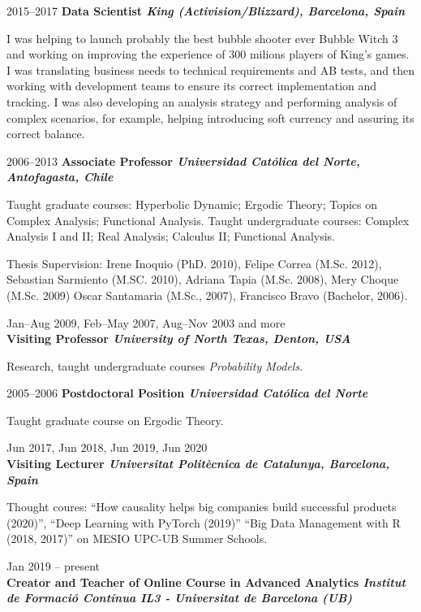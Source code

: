 \documentclass{article}
\begin{document}
\begin{CV}
\item[2015--2017] {\bf Data Scientist \it King (Activision/Blizzard), Barcelona, Spain}

  I was helping to launch probably the best bubble shooter ever Bubble Witch 3 and working on
  improving the experience of 300 milions players of King's games. I was translating business needs
  to technical requirements and AB tests, and then working with development teams to ensure its
  correct implementation and tracking. I was also developing an analysis strategy and performing
  analysis of complex scenarios, for example, helping introducing soft currency and assuring its
  correct balance.

\item[2006--2013] {\bf Associate Professor \it Universidad Cat\'olica del Norte,
    Antofagasta, Chile}

  Taught graduate courses: Hyperbolic Dynamic; Ergodic Theory; Topics
  on Complex Analysis; Functional Analysis.  Taught undergraduate
  courses: Complex Analysis I and II; Real Analysis; Calculus II;
  Functional Analysis.

  Thesis Supervision: Irene Inoquio (PhD. 2010), Felipe Correa
  (M.Sc. 2012), Sebastian Sarmiento (M.SC. 2010), Adriana Tapia
  (M.Sc. 2008), Mery Choque (M.Sc. 2009) Oscar Santamaria (M.Sc.,
  2007), Francisco Bravo (Bachelor, 2006).

\item[Jan--Aug 2009, Feb--May 2007, Aug--Nov 2003 and more]
  {\ \\ \bf Visiting Professor \it University of North Texas, Denton, USA}

  Research, taught undergraduate courses \emph{Probability Models}.

\item[2005--2006] {\bf Postdoctoral Position \it Universidad Cat\'olica del Norte}

  Taught graduate course on Ergodic Theory.

  \item[Jun 2017, Jun 2018, Jun 2019, Jun 2020] {\ \\ \bf Visiting Lecturer \it Universitat Politècnica de Catalunya, Barcelona, Spain}

  Thought coures: ``How causality helps big companies build successful products (2020)'', ``Deep Learning with PyTorch (2019)'' ``Big Data Management with R (2018, 2017)'' on MESIO UPC-UB Summer Schools.

  \item[Jan 2019 -- present] {\ \\ \bf Creator and Teacher of Online Course in Advanced Analytics \it Institut de Formació Contínua IL3 - Universitat de Barcelona (UB)}


\end{CV}
\end{document}
